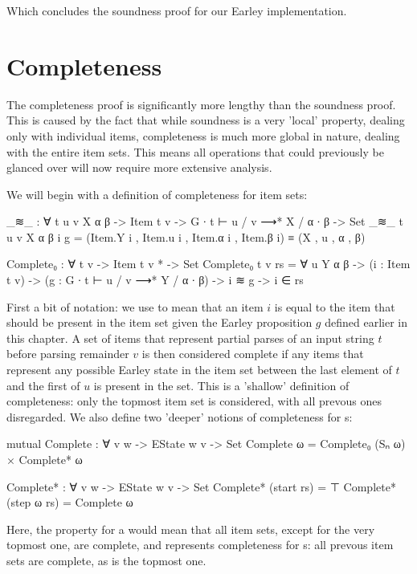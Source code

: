 		Which concludes the soundness proof for our Earley implementation.

	\section{Completeness}

		The completeness proof is significantly more lengthy than the soundness
		proof. This is caused by the fact that while soundness is a very
		'local' property, dealing only with individual items, completeness is
		much more global in nature, dealing with the entire item sets. This
		means all operations that could previously be glanced over will now
		require more extensive analysis.

		We will begin with a definition of completeness for item sets:

		\begin{code}
			_≋_ : ∀ {t u v X α β} -> Item t v -> G ∙ t ⊢ u / v ⟶* X / α ∙ β -> Set
			_≋_ {t} {u} {v} {X} {α} {β} i g =
				(Item.Y i , Item.u i , Item.α i , Item.β i) ≡ (X , u , α , β)

			Complete₀ : ∀ {t v} -> Item t v * -> Set
			Complete₀ {t} {v} rs = ∀ {u Y α β} ->
			  (i : Item t v) ->
			  (g : G ∙ t ⊢ u / v ⟶* Y / α ∙ β) ->
			  i ≋ g ->
			  i ∈ rs
		\end{code}

		First a bit of notation: we use  to mean that an item $i$
		is equal to the item that should be present in the item set given the
		Earley proposition $g$ defined earlier in this chapter. A set of items
		that represent partial parses of an input string $t$ before parsing
		remainder $v$ is then considered complete if any items that represent
		any possible Earley state in the item set between the last element of
		$t$ and the first of $u$ is present in the set. This is a 'shallow'
		definition of completeness: only the topmost item set is considered,
		with all prevous ones disregarded. We also define two 'deeper' notions of
		completeness for s:

		\begin{code}
			mutual
			  Complete : ∀ {v w} -> EState w v -> Set
			  Complete ω = Complete₀ (Sₙ ω) × Complete* ω

			  Complete* : ∀ {v w} -> EState w v -> Set
			  Complete* (start rs) = ⊤
			  Complete* (step ω rs) = Complete ω
		\end{code}

		Here, the  property for a  would mean
		that all item sets, except for the very topmost one, are complete, and
		 represents completeness for s: all
		prevous item sets are complete, as is the topmost one.

